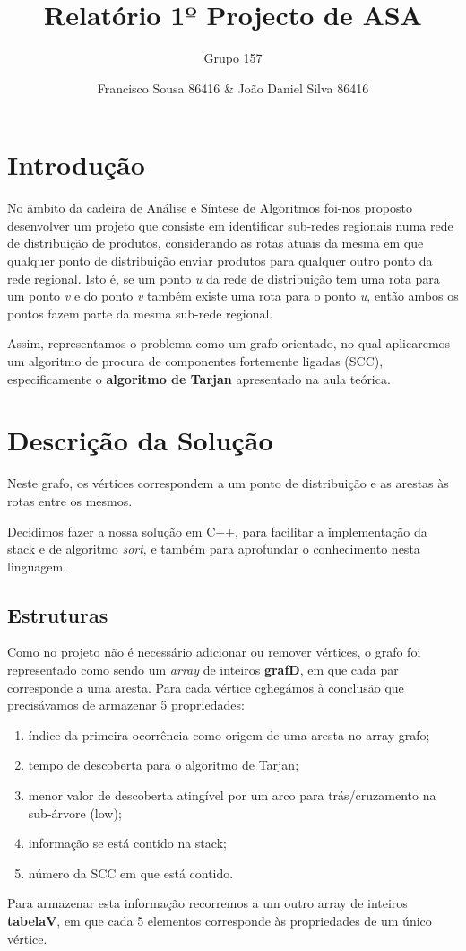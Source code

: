 \documentclass[12pt,a4paper]{article}
\author{Grupo 157 \and Francisco Sousa 86416 \& João Daniel Silva 86416}
\title{Relatório 1º Projecto de ASA}
\begin{document}
\maketitle

\section{Introdução}
No âmbito da cadeira de Análise e Síntese de Algoritmos foi-nos proposto desenvolver um projeto que consiste em identificar sub-redes regionais numa rede de distribuição
de produtos, considerando as rotas atuais da mesma em que qualquer ponto de distribuição enviar produtos para qualquer outro ponto da rede regional. Isto é, se um ponto \textit{u}
da rede de distribuição tem uma rota para um ponto \textit{v} e do ponto \textit{v} também existe uma rota para o ponto \textit{u}, então ambos os pontos fazem parte da mesma sub-rede regional.

Assim, representamos o problema como um grafo orientado, no qual aplicaremos um algoritmo de procura de componentes fortemente ligadas (SCC), especificamente o \textbf{algoritmo de Tarjan} apresentado na aula teórica.
\section{Descrição da Solução}
Neste grafo, os vértices correspondem a um ponto de distribuição e as arestas às rotas entre os mesmos.

Decidimos fazer a nossa solução em C++, para facilitar a implementação da stack e de algoritmo \textit{sort}, e também para aprofundar o conhecimento nesta linguagem.

\subsection{Estruturas}
Como no projeto não é necessário adicionar ou remover vértices, o grafo foi representado como sendo um \textit{array} de inteiros \textbf{grafD}, em que cada par corresponde a uma aresta.
Para cada vértice cghegámos à conclusão que precisávamos de armazenar 5 propriedades:
\begin{enumerate}
	\item índice da primeira ocorrência como origem de uma aresta no array grafo;
	\item tempo de descoberta para o algoritmo de Tarjan;
	\item menor valor de descoberta atingível por um arco para trás/cruzamento na sub-árvore (low);
	\item informação se está contido na stack; %
	\item número da SCC em que está contido.
\end{enumerate}
Para armazenar esta informação recorremos a um outro array de inteiros \textbf{tabelaV}, em que cada 5 elementos corresponde às propriedades de um único vértice.
\end{document}
